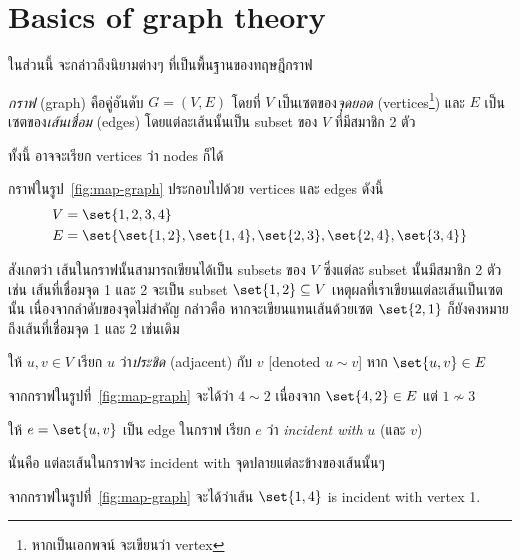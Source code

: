\section{Basics of graph theory}

ในส่วนนี้ จะกล่าวถึงนิยามต่างๆ ที่เป็นพื้นฐานของทฤษฎีกราฟ

\begin{definition}
    \emph{กราฟ} (graph) คือคู่อันดับ $G=(V,E)$ โดยที่ $V$ เป็นเซตของ\emph{จุดยอด} (vertices\footnote{หากเป็นเอกพจน์ จะเขียนว่า vertex}) และ $E$ เป็นเซตของ\emph{เส้นเชื่อม} (edges) โดยแต่ละเส้นนั้นเป็น subset ของ $V$ ที่มีสมาชิก 2 ตัว
\end{definition}
ทั้งนี้ อาจจะเรียก vertices ว่า nodes ก็ได้

\begin{example}
กราฟในรูป~\ref{fig:map-graph} ประกอบไปด้วย vertices และ edges ดังนี้
\begin{align*}
    V &= \set{1,2,3,4} \\
    E &= \set{\set{1,2}, \set{1,4}, \set{2,3}, \set{2,4}, \set{3,4}}
\end{align*}
\end{example}
%
สังเกตว่า เส้นในกราฟนั้นสามารถเขียนได้เป็น subsets ของ $V$ ซึ่งแต่ละ subset นั้นมีสมาชิก 2 ตัว เช่น เส้นที่เชื่อมจุด 1 และ 2 จะเป็น subset $\set{1,2}\subseteq V$ \enskip เหตุผลที่เราเขียนแต่ละเส้นเป็นเซตนั้น เนื่องจากลำดับของจุดไม่สำคัญ กล่าวคือ หากจะเขียนแทนเส้นด้วยเซต $\set{2,1}$ ก็ยังคงหมายถึงเส้นที่เชื่อมจุด 1 และ 2 เช่นเดิม

\begin{definition}
ให้ $u,v\in V$ \enskip เรียก $u$ ว่า\emph{ประชิด} (adjacent) กับ $v$ [denoted $u\sim v$] หาก $\set{u,v}\in E$
\end{definition}
%
\begin{example}
จากกราฟในรูปที่~\ref{fig:map-graph} จะได้ว่า $4\sim 2$ เนื่องจาก $\set{4,2}\in E$ แต่ $1\not\sim 3$
\end{example}

\begin{definition}
ให้ $e=\set{u,v}$ เป็น edge ในกราฟ \enskip เรียก $e$ ว่า \emph{incident with} $u$ (และ $v$)
\end{definition}
นั่นคือ แต่ละเส้นในกราฟจะ incident with จุดปลายแต่ละข้างของเส้นนั้นๆ

\begin{example}
จากกราฟในรูปที่~\ref{fig:map-graph} จะได้ว่าเส้น $\set{1,4}$ is incident with vertex 1.
\end{example}

